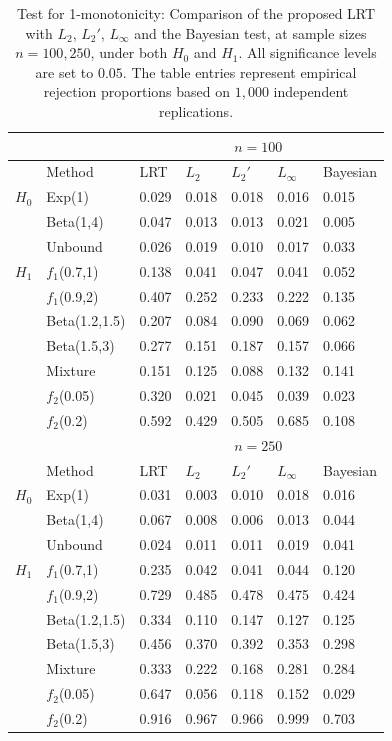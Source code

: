 \documentclass[12pt,letterpaper, twoside, openany]{article}
\theoremstyle{plain}
\begin{document}
\begin{table}
\centering
\begin{tabular}{lllllll}
\hline
  \multicolumn{1}{c}{} && \multicolumn{5}{c}{$n=100$}  \\ \hline
 &Method & LRT & $L_2$ & $L_2'$ & $L_\infty$ & Bayesian\\
  \hline
$H_0$ &Exp(1) & 0.029 & 0.018 & 0.018 & 0.016  & 0.015 \\ 
%
 & Beta(1,4) & 0.047 & 0.013 & 0.013 & 0.021   & 0.005 \\ 
&  Unbound & 0.026 & 0.019 & 0.010 & 0.017   &  0.033 \\ \hline
%
$H_1$  & $f_1$(0.7,1) & 0.138 & 0.041 & 0.047 & 0.041   & 0.052 \\ 
%
  & $f_1$(0.9,2) & 0.407 & 0.252 & 0.233 & 0.222 & 0.135 \\ 
  &Beta(1.2,1.5) & 0.207 & 0.084 & 0.090 & 0.069  &  0.062\\ 
  &Beta(1.5,3) & 0.277 & 0.151 & 0.187 & 0.157  & 0.066\\ 
  &Mixture & 0.151 & 0.125 & 0.088 & 0.132   & 0.141\\ 
  &$f_2$(0.05) & 0.320 & 0.021 & 0.045 & 0.039   & 0.023 \\ 
  &$f_2$(0.2) & 0.592 & 0.429 & 0.505 & 0.685   & 0.108\\ 
   \hline
    \multicolumn{1}{c}{} &&  \multicolumn{5}{c}{$n=250$}  \\ \hline
 &Method & LRT & $L_2$ & $L_2'$ & $L_\infty$ & Bayesian \\ 
  \hline
$H_0$ &Exp(1) &  0.031  &0.003 & 0.010 & 0.018 & 0.016 \\ 
%
 & Beta(1,4) & 0.067 & 0.008 & 0.006 & 0.013   &0.044 \\ 
&  Unbound &  0.024 & 0.011 & 0.011 & 0.019   &0.041 \\ \hline
%
$H_1$  & $f_1$(0.7,1) & 0.235 & 0.042 & 0.041 & 0.044  & 0.120\\ 
%
  & $f_1$(0.9,2) &  0.729 & 0.485 & 0.478 & 0.475  & 0.424\\ 
  &Beta(1.2,1.5) &  0.334 & 0.110 & 0.147 & 0.127  & 0.125\\ 
  &Beta(1.5,3) &  0.456 & 0.370 & 0.392 & 0.353 & 0.298 \\ 
  &Mixture & 0.333 & 0.222 & 0.168 & 0.281   & 0.284 \\ 
  &$f_2$(0.05) & 0.647 & 0.056 & 0.118 & 0.152  &  0.029\\ 
  &$f_2$(0.2) & 0.916 & 0.967 & 0.966 & 0.999 & 0.703\\ 
   \hline
\end{tabular}
\caption{Test for 1-monotonicity: Comparison of the proposed LRT with $L_2$, $L_2'$, $L_\infty$ and the Bayesian test, at sample sizes $n = 100, 250$, under both $H_0$ and $H_1$. All significance levels are set to $0.05$. The table entries represent empirical rejection proportions based on $1{,}000$ independent replications.}
    \label{table:monotone_result1}
\end{table}
\end{document}
